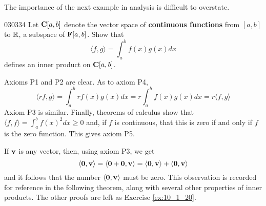 The importance of the next example in analysis is difficult to overstate. 

\begin{example}{\footnotemark}{030334}
Let $\textbf{C}[a, b]$ denote the vector space of
\textbf{continuous functions} from $[a, b]$ to $\mathbb{R}$, a subspace of $\textbf{F}[a, b]$. Show that
\begin{equation*}
\langle f, g \rangle = \int_{a}^{b} f(x)g(x)dx
\end{equation*}
defines an inner product on $\textbf{C}[a, b]$.

\begin{solution}
Axioms P1 and P2 are clear. As to axiom P4,
\begin{equation*}
\langle rf, g \rangle = \int_{a}^{b} rf(x)g(x)dx = r\int_{a}^{b} f(x)g(x)dx = 
r\langle f, g \rangle
\end{equation*}
Axiom P3 is similar. Finally, theorems of calculus show that $\langle f, f \rangle = \int_{a}^{b} f(x)^2dx \geq 0$ and, if $f$ is continuous, that this is zero if and only if $f$ is the zero function. This gives axiom P5.
\end{solution}
\end{example}

If $\textbf{v}$ is any vector, then, using axiom P3, we get
\begin{equation*}
\langle \textbf{0}, \textbf{v} \rangle = \langle \textbf{0} + \textbf{0}, \textbf{v} \rangle =
\langle \textbf{0}, \textbf{v} \rangle + \langle \textbf{0}, \textbf{v} \rangle
\end{equation*}
and it follows that the number $\langle\textbf{0}, \textbf{v}\rangle$ must be zero. This observation is recorded for reference in the following theorem, along with several other properties of inner products. The other proofs are left as Exercise \ref{ex:10_1_20}.


